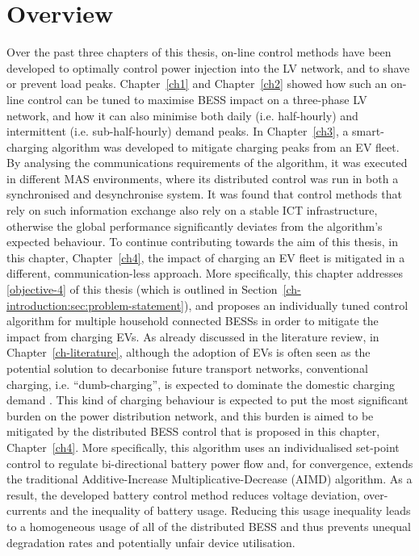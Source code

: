 \section{Overview}
\label{ch4:sec:overview}

Over the past three chapters of this thesis, on-line control methods have been developed to optimally control power injection into the LV network, and to shave or prevent load peaks.
Chapter~\ref{ch1} and Chapter~\ref{ch2} showed how such an on-line control can be tuned to maximise BESS impact on a three-phase LV network, and how it can also minimise both daily (i.e. half-hourly) and intermittent (i.e. sub-half-hourly) demand peaks.
In Chapter~\ref{ch3}, a smart-charging algorithm was developed to mitigate charging peaks from an EV fleet.
By analysing the communications requirements of the algorithm, it was executed in different MAS environments, where its distributed control was run in both a synchronised and desynchronise system.
It was found that control methods that rely on such information exchange also rely on a stable ICT infrastructure, otherwise the global performance significantly deviates from the algorithm's expected behaviour.
To continue contributing towards the aim of this thesis, in this chapter, Chapter~\ref{ch4}, the impact of charging an EV fleet is mitigated in a different, communication-less approach.
More specifically, this chapter addresses \ref{objective-4} of this thesis (which is outlined in Section~\ref{ch-introduction:sec:problem-statement}), and proposes an individually tuned control algorithm for multiple household connected BESSs in order to mitigate the impact from charging EVs.
As already discussed in the literature review, in Chapter~\ref{ch-literature}, although the adoption of EVs is often seen as the potential solution to decarbonise future transport networks, conventional charging, i.e. ``dumb-charging'', is expected to dominate the domestic charging demand \cite{Shah2015}.
This kind of charging behaviour is expected to put the most significant burden on the power distribution network, and this burden is aimed to be mitigated by the distributed BESS control that is proposed in this chapter, Chapter~\ref{ch4}.
More specifically, this algorithm uses an individualised set-point control to regulate bi-directional battery power flow and, for convergence, extends the traditional Additive-Increase Multiplicative-Decrease (AIMD) algorithm.
As a result, the developed battery control method reduces voltage deviation, over-currents and the inequality of battery usage.
Reducing this usage inequality leads to a homogeneous usage of all of the distributed BESS and thus prevents unequal degradation rates and potentially unfair device utilisation.

